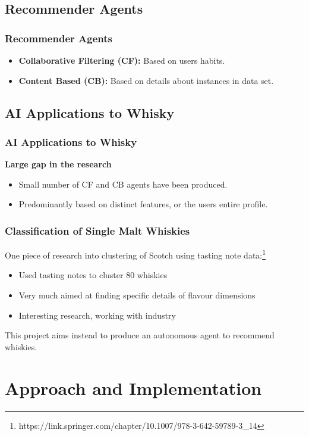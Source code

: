 \documentclass{beamer}
\begin{document}
\subsection{Recommender Agents}
\begin{frame}
    \frametitle{Recommender Agents}
    \begin{itemize}
        \item \textbf{Collaborative Filtering (CF): }Based on users habits.
        \item \textbf{Content Based (CB): }Based on details about instances in data set.
    \end{itemize}
\end{frame}

\subsection{AI Applications to Whisky}
\begin{frame}
    \frametitle{AI Applications to Whisky}
    \textbf{Large gap in the research}
    \begin{itemize}
        \item Small number of CF and CB agents have been produced.
        \item Predominantly based on distinct features, or the users
        entire profile.
    \end{itemize}
\end{frame}

\begin{frame}
    \frametitle{Classification of Single Malt Whiskies}
    One piece of research into clustering of Scotch using tasting note data:\footnote{https://link.springer.com/chapter/10.1007/978-3-642-59789-3\_14}
    \begin{itemize}
        \item Used tasting notes to cluster 80 whiskies
        \item Very much aimed at finding specific details of flavour dimensions
        \item Interesting research, working with industry
    \end{itemize}
    This project aims instead to produce an autonomous agent to recommend whiskies.
\end{frame}

\section{Approach and Implementation} 
\end{document}
